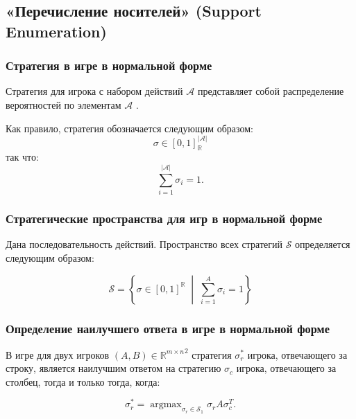 \subsection{«Перечисление носителей» (Support Enumeration)}

\subsubsection*{Стратегия в игре в нормальной форме}

Стратегия для игрока с набором действий \( \mathcal{A} \) представляет собой распределение вероятностей по элементам \( \mathcal{A} \) \cite{gibbons1992game}.

Как правило, стратегия обозначается следующим образом:
\begin{equation}
\sigma \in [0, 1]_{\mathbb{R}}^{|\mathcal{A}|}
\end{equation}
так что:
\begin{equation}
\sum_{i=1}^{|\mathcal{A}|} \sigma_i = 1.
\end{equation}

\subsubsection*{Стратегические пространства для игр в нормальной форме}

Дана последовательность действий. Пространство всех стратегий \( \mathcal{S} \) определяется следующим образом:

\begin{equation}
\mathcal{S} = \left\{ \sigma \in [0, 1]^{\mathbb{R}} \;\middle|\; \sum_{i=1}^{A} \sigma_i = 1 \right\}
\end{equation}

\subsubsection*{Определение наилучшего ответа в игре в нормальной форме}
\label{sec:best-response}

В игре для двух игроков \((A,B)\in{\mathbb{R}^{m\times n}}^2\) стратегия
\(\sigma_r^*\) игрока, отвечающего за строку, является наилучшим ответом на
стратегию \(\sigma_c\) игрока, отвечающего за столбец, тогда и только тогда, когда:

\begin{equation}
\sigma_r^* = \operatorname{argmax}_{\sigma_r \in \mathcal{S}_1} \sigma_r A \sigma_c^T.
\end{equation}

